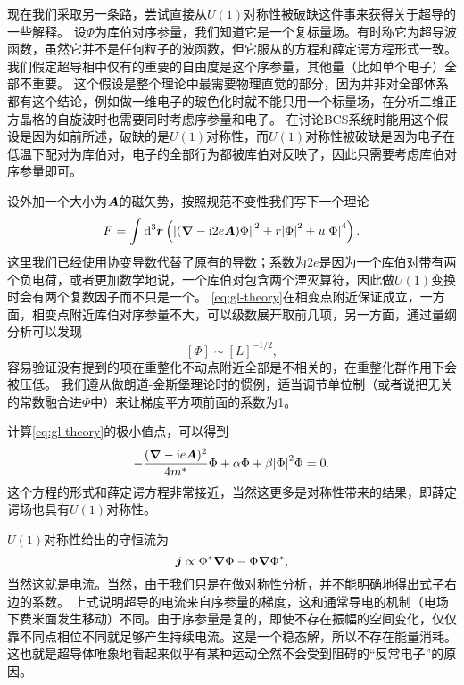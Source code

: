 现在我们采取另一条路，尝试直接从$U(1)$对称性被破缺这件事来获得关于超导的一些解释。
设$\Phi$为库伯对序参量，我们知道它是一个复标量场。有时称它为超导波函数，虽然它并不是任何粒子的波函数，但它服从的方程和薛定谔方程形式一致。
我们假定超导相中仅有的重要的自由度是这个序参量，其他量（比如单个电子）全部不重要。
这个假设是整个理论中最需要物理直觉的部分，因为并非对全部体系都有这个结论，例如做一维电子的玻色化时就不能只用一个标量场，在分析二维正方晶格的自旋波时也需要同时考虑序参量和电子。
在讨论BCS系统时能用这个假设是因为如前所述，破缺的是$U(1)$对称性，而$U(1)$对称性被破缺是因为电子在低温下配对为库伯对，电子的全部行为都被库伯对反映了，因此只需要考虑库伯对序参量即可。

设外加一个大小为$\vb*{A}$的磁矢势，按照规范不变性我们写下一个理论
\begin{equation}
    F = \int \dd[3]{\vb*{r}} \left( \abs*{(\grad - \mathrm{i} 2 e \vb*{A}) \Phi}^2 + r \abs{\Phi}^2 + u\abs{\Phi}^4 \right).
    \label{eq:gl-theory}
\end{equation}
这里我们已经使用协变导数代替了原有的导数；系数为$2e$是因为一个库伯对带有两个负电荷，或者更加数学地说，一个库伯对包含两个湮灭算符，因此做$U(1)$变换时会有两个复数因子而不只是一个。
\eqref{eq:gl-theory}在相变点附近保证成立，一方面，相变点附近库伯对序参量不大，可以级数展开取前几项，另一方面，通过量纲分析可以发现
\[
    [\Phi] \sim [L]^{-1/2},
\]
容易验证没有提到的项在重整化不动点附近全部是不相关的，在重整化群作用下会被压低。
我们遵从做朗道-金斯堡理论时的惯例，适当调节单位制（或者说把无关的常数融合进$\Phi$中）来让梯度平方项前面的系数为1。

计算\eqref{eq:gl-theory}的极小值点，可以得到
\begin{equation}
    - \frac{(\grad - \mathrm{i} e \vb*{A})^2}{4 m^*} \Phi + \alpha \Phi + \beta \abs{\Phi}^2 \Phi = 0.
\end{equation}
这个方程的形式和薛定谔方程非常接近，当然这更多是对称性带来的结果，即薛定谔场也具有$U(1)$对称性。

$U(1)$对称性给出的守恒流为
\begin{equation}
    \vb*{j} \propto \Phi^* \grad{\Phi} - \Phi \grad{\Phi^*},
\end{equation}
当然这就是电流。当然，由于我们只是在做对称性分析，并不能明确地得出式子右边的系数。
上式说明超导的电流来自序参量的梯度，这和通常导电的机制（电场下费米面发生移动）不同。由于序参量是复的，即使不存在振幅的空间变化，仅仅靠不同点相位不同就足够产生持续电流。这是一个稳态解，所以不存在能量消耗。这也就是超导体唯象地看起来似乎有某种运动全然不会受到阻碍的“反常电子”的原因。

